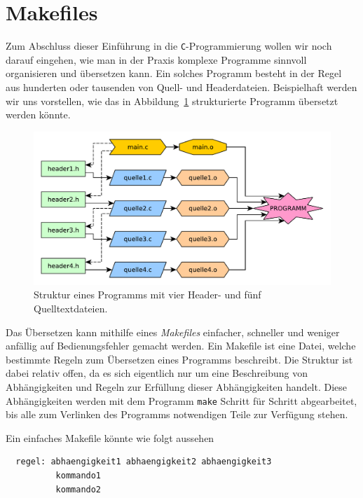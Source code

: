 \section{Makefiles}

Zum Abschluss dieser Einführung in die \texttt{C}-Programmierung wollen wir noch darauf eingehen, wie man in der Praxis komplexe Programme sinnvoll organisieren und übersetzen kann.
Ein solches Programm besteht in der Regel aus hunderten oder tausenden von Quell- und Headerdateien.
Beispielhaft werden wir uns vorstellen, wie das in Abbildung~\ref{fig:abhaengigkeiten} strukturierte Programm übersetzt werden könnte.

\begin{figure}
  \includegraphics[width=\textwidth]{graphics/abhaengigkeiten}
  \caption{\label{fig:abhaengigkeiten} Struktur eines Programms mit vier Header- und fünf Quelltextdateien.}
\end{figure}

Das Übersetzen kann mithilfe eines \emph{Makefiles} einfacher, schneller und weniger anfällig auf Bedienungsfehler gemacht werden.
Ein Makefile ist eine Datei, welche bestimmte Regeln zum Übersetzen eines Programms beschreibt.
Die Struktur ist dabei relativ offen, da es sich eigentlich nur um eine Beschreibung von Abhängigkeiten und Regeln zur Erfüllung dieser Abhängigkeiten handelt.
Diese Abhängigkeiten werden mit dem Programm \texttt{make} Schritt für Schritt abgearbeitet, bis alle zum Verlinken des Programms notwendigen Teile zur Verfügung stehen.

Ein einfaches Makefile könnte wie folgt aussehen
\begin{lstlisting}
  regel: abhaengigkeit1 abhaengigkeit2 abhaengigkeit3
          kommando1
          kommando2
\end{lstlisting}

\endinput

